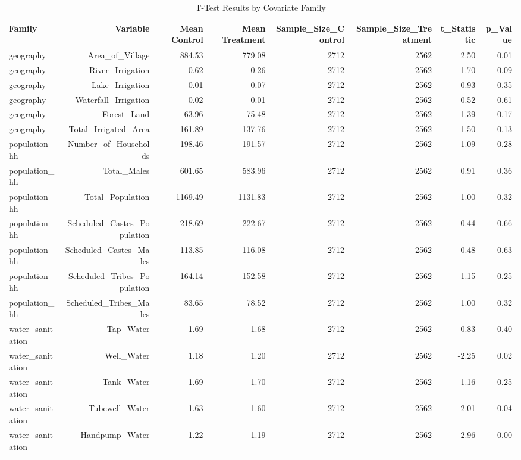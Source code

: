 \begin{table}[ht]
\centering
\caption{T-Test Results by Covariate Family} 
\label{tab:t_tests}
\begin{tabular}{lrrrrrrr}
  \hline
Family & Variable & Mean Control & Mean Treatment & Sample_Size_Control & Sample_Size_Treatment & t_Statistic & p_Value \\ 
  \hline
geography & Area_of_Village & 884.53 & 779.08 & 2712 & 2562 & 2.50 & 0.01 \\ 
  geography & River_Irrigation & 0.62 & 0.26 & 2712 & 2562 & 1.70 & 0.09 \\ 
  geography & Lake_Irrigation & 0.01 & 0.07 & 2712 & 2562 & -0.93 & 0.35 \\ 
  geography & Waterfall_Irrigation & 0.02 & 0.01 & 2712 & 2562 & 0.52 & 0.61 \\ 
  geography & Forest_Land & 63.96 & 75.48 & 2712 & 2562 & -1.39 & 0.17 \\ 
  geography & Total_Irrigated_Area & 161.89 & 137.76 & 2712 & 2562 & 1.50 & 0.13 \\ 
  population_hh & Number_of_Households & 198.46 & 191.57 & 2712 & 2562 & 1.09 & 0.28 \\ 
  population_hh & Total_Males & 601.65 & 583.96 & 2712 & 2562 & 0.91 & 0.36 \\ 
  population_hh & Total_Population & 1169.49 & 1131.83 & 2712 & 2562 & 1.00 & 0.32 \\ 
  population_hh & Scheduled_Castes_Population & 218.69 & 222.67 & 2712 & 2562 & -0.44 & 0.66 \\ 
  population_hh & Scheduled_Castes_Males & 113.85 & 116.08 & 2712 & 2562 & -0.48 & 0.63 \\ 
  population_hh & Scheduled_Tribes_Population & 164.14 & 152.58 & 2712 & 2562 & 1.15 & 0.25 \\ 
  population_hh & Scheduled_Tribes_Males & 83.65 & 78.52 & 2712 & 2562 & 1.00 & 0.32 \\ 
  water_sanitation & Tap_Water & 1.69 & 1.68 & 2712 & 2562 & 0.83 & 0.40 \\ 
  water_sanitation & Well_Water & 1.18 & 1.20 & 2712 & 2562 & -2.25 & 0.02 \\ 
  water_sanitation & Tank_Water & 1.69 & 1.70 & 2712 & 2562 & -1.16 & 0.25 \\ 
  water_sanitation & Tubewell_Water & 1.63 & 1.60 & 2712 & 2562 & 2.01 & 0.04 \\ 
  water_sanitation & Handpump_Water & 1.22 & 1.19 & 2712 & 2562 & 2.96 & 0.00 \\ 

\end{tabular}
\end{table}
